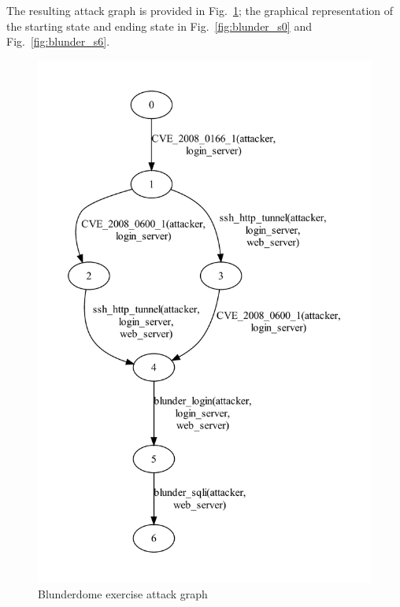 The resulting attack graph is provided in Fig.~\ref{fig:blunder_ag}; the
graphical representation of the starting state and ending state in 
Fig.~\ref{fig:blunder_s0} and Fig.~\ref{fig:blunder_s6}.

\begin{figure}
\includegraphics[width=5in]{ag_blunderdome/ag_depth5}
\caption{Blunderdome exercise attack graph}
\label{fig:blunder_ag}
\end{figure}

